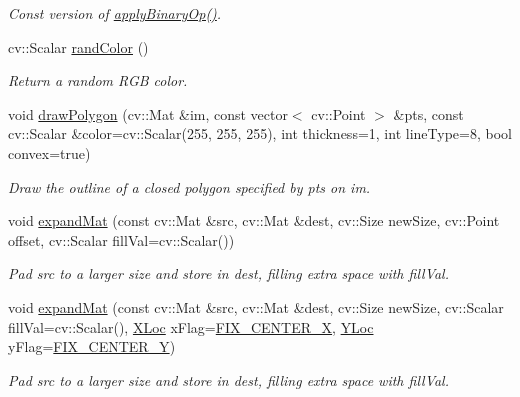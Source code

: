 \begin{DoxyCompactItemize}
\begin{DoxyCompactList}\small\item\em Const version of \hyperlink{namespacecvutils_a9a51cd204369adbf1321482a67c101dc}{apply\-Binary\-Op()}. \end{DoxyCompactList}\item 
cv\-::\-Scalar \hyperlink{namespacecvutils_abcad4782a40d57854115ea2dcdab401b}{rand\-Color} ()
\begin{DoxyCompactList}\small\item\em Return a random R\-G\-B color. \end{DoxyCompactList}\item 
void \hyperlink{namespacecvutils_a683e21d8e2c62e903c76ae0279e4a94d}{draw\-Polygon} (cv\-::\-Mat \&im, const vector$<$ cv\-::\-Point $>$ \&pts, const cv\-::\-Scalar \&color=cv\-::\-Scalar(255, 255, 255), int thickness=1, int line\-Type=8, bool convex=true)
\begin{DoxyCompactList}\small\item\em Draw the outline of a closed polygon specified by {\ttfamily pts} on {\ttfamily im}. \end{DoxyCompactList}\item 
void \hyperlink{namespacecvutils_ada4f02293fd7783beff2240b94d625a7}{expand\-Mat} (const cv\-::\-Mat \&src, cv\-::\-Mat \&dest, cv\-::\-Size new\-Size, cv\-::\-Point offset, cv\-::\-Scalar fill\-Val=cv\-::\-Scalar())
\begin{DoxyCompactList}\small\item\em Pad {\ttfamily src} to a larger size and store in {\ttfamily dest}, filling extra space with {\ttfamily fill\-Val}. \end{DoxyCompactList}\item 
void \hyperlink{namespacecvutils_a128502dc926237b41ee2598574a4b409}{expand\-Mat} (const cv\-::\-Mat \&src, cv\-::\-Mat \&dest, cv\-::\-Size new\-Size, cv\-::\-Scalar fill\-Val=cv\-::\-Scalar(), \hyperlink{namespacecvutils_a955c1d8733f727414da8a357b938ced7}{X\-Loc} x\-Flag=\hyperlink{namespacecvutils_a955c1d8733f727414da8a357b938ced7a6a9a0a917be940c0641d145580dcf0f7}{F\-I\-X\-\_\-\-C\-E\-N\-T\-E\-R\-\_\-\-X}, \hyperlink{namespacecvutils_a0a32f5be1c20397001a2cdc59bacec81}{Y\-Loc} y\-Flag=\hyperlink{namespacecvutils_a0a32f5be1c20397001a2cdc59bacec81ad6382055c3ad3cb882f8f123e3b64f38}{F\-I\-X\-\_\-\-C\-E\-N\-T\-E\-R\-\_\-\-Y})
\begin{DoxyCompactList}\small\item\em Pad {\ttfamily src} to a larger size and store in {\ttfamily dest}, filling extra space with {\ttfamily fill\-Val}. \end{DoxyCompactList}\item 

\end{DoxyCompactItemize}

